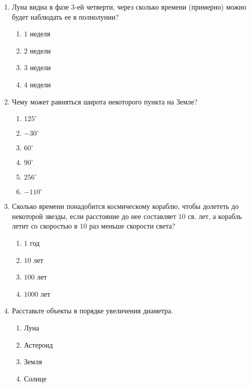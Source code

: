 \documentclass[12pt]{article}
\begin{document}
\begin{enumerate}
	\item Луна видна в фазе 3-ей четверти, через сколько времени (примерно) можно будет наблюдать ее в полнолунии?
	\begin{multicols}{2}
		\begin{enumerate}[label=\textbf{\Alph*.}]
			\item{$1$ неделя} \item{$2$ недели}
			\item{$3$ недели} \item{$4$ недели} 
		\end{enumerate}
	\end{multicols}

	\item Чему может равняться широта некоторого пункта на Земле?
	\begin{multicols}{2}
		\begin{enumerate}[label=\textbf{\Alph*.}]
			\item{$125^{\circ}$} \item{$-30^{\circ}$} \item{$60^{\circ}$}
			\item{$90^{\circ}$} \item{$256^{\circ}$} \item{$-110^{\circ}$}
		\end{enumerate}
	\end{multicols}

	\item Сколько времени понадобится космическому кораблю, чтобы долететь до некоторой звезды, если расстояние до нее составляет $10$ св. лет, а корабль летит со скоростью в $10$ раз меньше скорости света?
	\begin{multicols}{2}
		\begin{enumerate}[label=\textbf{\Alph*.}]
			\item{$1$ год} \item{$10$ лет}
			\item{$100$ лет} \item{$1000$ лет} 
		\end{enumerate}
	\end{multicols}

	\item Расставьте объекты в порядке увеличения диаметра.
	\begin{multicols}{2}
		\begin{enumerate}[label=\textbf{\Alph*.}]
			\item{Луна} \item{Астероид}
			\item{Земля} \item{Солнце} 
		\end{enumerate}
	\end{multicols}


\end{enumerate}
\end{document}
